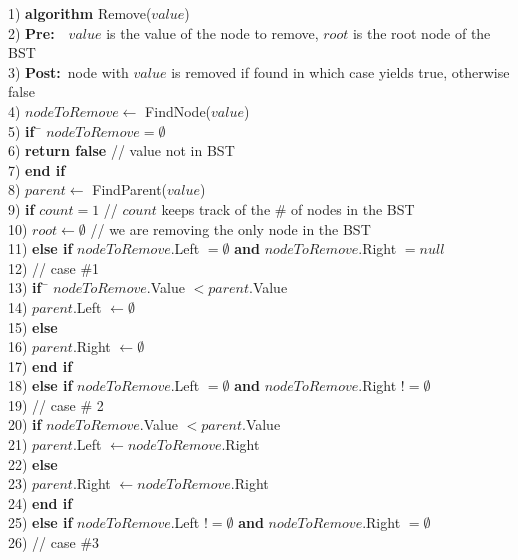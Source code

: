 \newpage
\begin{tabbing}
1)  \textbf{alg}\= \textbf{orithm} Remove($value$) \\
2)  \> \textbf{Pre:}~~$value$ is the value of the node to remove, $root$ is the root node of the BST \\
3)  \> \textbf{Post:}~node with $value$ is removed if found in which case yields true, otherwise false \\
4)  \> $nodeToRemove \leftarrow$ FindNode($value$) \\
5)  \> \textbf{if}~\= $nodeToRemove = \emptyset$ \\
6)  \> \> \textbf{return false} // value not in BST \\
7)  \> \textbf{end if} \\
8)  \> $parent \leftarrow$ FindParent($value$) \\
9)  \> \textbf{if} $count = 1$ // $count$ keeps track of the \# of nodes in the BST \\
10) \> \> $root \leftarrow \emptyset$ // we are removing the only node in the BST \\
11) \> \textbf{else if} $nodeToRemove$.Left $= \emptyset$ \textbf{and} $nodeToRemove$.Right $= null$ \\
12) \> \> // case \#1 \\
13) \> \> \textbf{if}~\= $nodeToRemove$.Value $< parent$.Value \\
14) \> \> \> $parent$.Left $\leftarrow \emptyset$ \\
15) \> \> \textbf{else} \\
16) \> \> \> $parent$.Right $\leftarrow \emptyset$ \\
17) \> \> \textbf{end if} \\
18) \> \textbf{else if} $nodeToRemove$.Left $= \emptyset$ \textbf{and} $nodeToRemove$.Right $!= \emptyset$ \\
19) \> \> // case \# 2 \\
20) \> \> \textbf{if} $nodeToRemove$.Value $< parent$.Value \\
21) \> \> \> $parent$.Left $\leftarrow nodeToRemove$.Right \\
22) \> \> \textbf{else} \\
23) \> \> \> $parent$.Right $\leftarrow nodeToRemove$.Right \\
24) \> \> \textbf{end if} \\
25) \> \textbf{else if} $nodeToRemove$.Left $!= \emptyset$ \textbf{and} $nodeToRemove$.Right $= \emptyset$ \\
26) \> \> // case \#3 \\

\end{tabbing}
